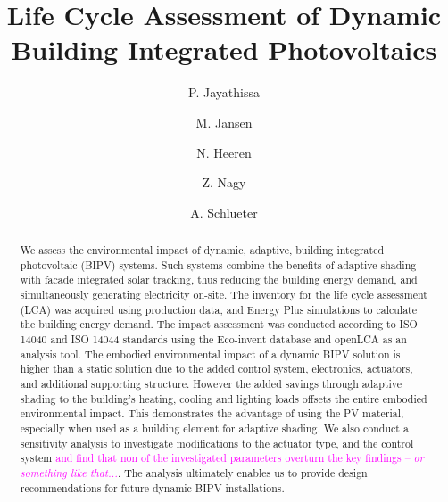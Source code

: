 \documentclass[preprint,12pt]{elsarticle} %
\begin{document}
\begin{frontmatter}

\title{Life Cycle Assessment of Dynamic Building Integrated Photovoltaics} 

\author[ita]{P. Jayathissa }
\address[ita]{Architecture and Building Systems, Institute of Technology in Architecture, Department of Architecture,\\ ETH Zurich, Switzerland} 

\author[ita]{M. Jansen}

\author[baug]{N. Heeren}
\address[baug]{Ecological System Design, Institute of Environmental Engineering,\\ ETH Zurich, Switzerland}

\author[ita]{Z. Nagy}



\author[ita]{A. Schlueter  }



\begin{abstract}
We assess the environmental impact of dynamic, adaptive, building integrated photovoltaic (BIPV) systems. Such systems combine the benefits of adaptive shading with facade integrated solar tracking, thus reducing the building energy demand, and simultaneously generating electricity on-site. The inventory for the life cycle assessment (LCA) was acquired using production data, and Energy Plus simulations to calculate the building energy demand. The impact assessment was conducted according to ISO 14040 and ISO 14044 standards using the Eco-invent database and openLCA as an analysis tool. The embodied environmental impact of a dynamic BIPV solution is higher than a static solution due to the added control system, electronics, actuators, and additional supporting structure. However the added savings through adaptive shading to the building's heating, cooling and lighting loads offsets the entire embodied environmental impact. This demonstrates the advantage of using the PV material, especially when used as a building element for adaptive shading. We also conduct a sensitivity analysis to investigate modifications to the actuator type, and the control system \textcolor{magenta}{and find that non of the investigated parameters overturn the key findings -- \textit{or something like that...}}. The analysis ultimately enables us to provide design recommendations for future dynamic BIPV installations. 


\end{abstract}
\end{frontmatter}
\end{document}
